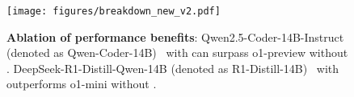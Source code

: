 \begin{figure}[!t]
    \centering
    \texttt{[image: figures/breakdown\_new\_v2.pdf]}      
    \caption{
    \textbf{Ablation of \frameworkname performance benefits}: Qwen2.5-Coder-14B-Instruct (denoted as Qwen-Coder-14B)~\citep{hui2024qwen2} with \frameworkname can surpass o1-preview without \frameworkname. DeepSeek-R1-Distill-Qwen-14B (denoted as R1-Distill-14B)~\citep{guo2025deepseek} with \frameworkname outperforms o1-mini without \frameworkname.
    }
    \label{fig:breakdown}
\end{figure}